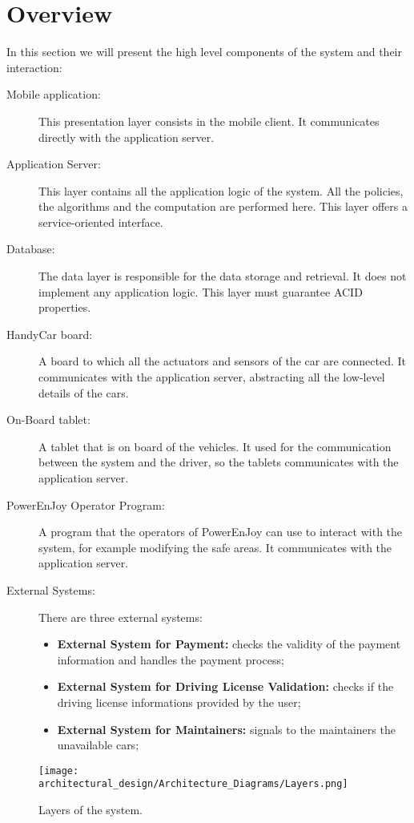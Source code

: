 \section{Overview}
In this section we will present the high level components of the system and their interaction:

\begin{description}
\item[Mobile application:] This presentation layer consists in the mobile client. It communicates directly with the application server.
\item[Application Server:] This layer contains all the application logic of the system. All the policies, the algorithms and the computation are performed here. This layer offers a service-oriented interface.
\item[Database:] The data layer is responsible for the data storage and retrieval. It does not implement any application logic. This layer must guarantee ACID properties. 
\item[HandyCar board:] A board to which all the actuators and sensors of the car are connected.
It communicates with the application server, abstracting all the low-level details of the cars.
\item[On-Board tablet:] A tablet that is on board of the vehicles. It used for the communication between the system and the driver, so the tablets communicates with the application server.
\item[PowerEnJoy Operator Program:] A program that the operators of PowerEnJoy can use to interact with the system, for example modifying the safe areas. It communicates with the application server.
\item[External Systems:] There are three external systems: 
	\begin{itemize}
		\item \textbf{External System for Payment:} checks the validity of the payment information and handles the payment process;
		\item \textbf{External System for Driving License Validation:} checks if the driving license informations provided by the user;
		\item \textbf{External System for Maintainers:} signals to the maintainers the unavailable cars;
	\end{itemize}
\end{description}

\begin{figure}
	\centering
	\texttt{[image: architectural\_design/Architecture\_Diagrams/Layers.png]}
	\caption{Layers of the system.}
	\label{fig:layers}
\end{figure}

